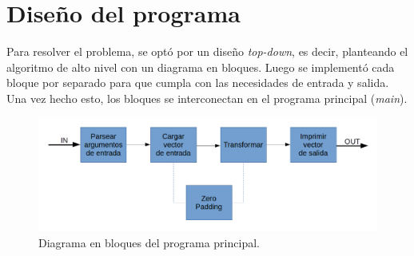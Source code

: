 \documentclass{article}
\begin{document}
\section{Diseño del programa}
    Para resolver el problema, se optó por un diseño \textit{top-down}, es decir,
  planteando el algoritmo de alto nivel con un diagrama en bloques. Luego se implementó
  cada bloque por separado para que cumpla con las necesidades de entrada y salida.
  Una vez hecho esto, los bloques se interconectan en el programa principal (\textit{main}).
  \begin{figure}
  \begin{centering}
  \includegraphics[scale=0.25]{Imagenes/disenio_del_programa.png}
  \par\end{centering}
  \caption{Diagrama en bloques del programa principal.}
  \end{figure}
\end{document}
